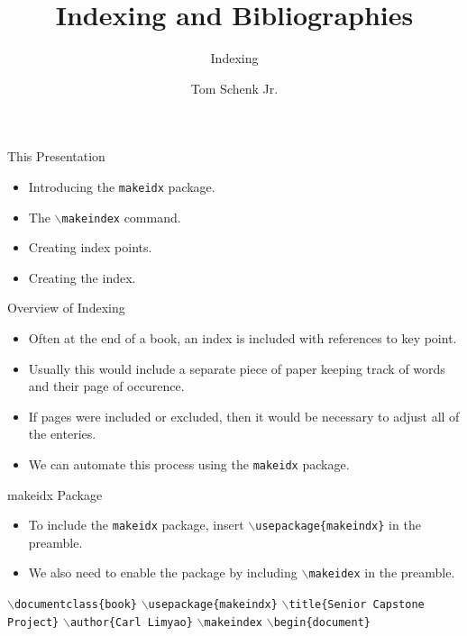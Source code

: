 \documentclass[pdf]{prosper}
\title{Indexing and Bibliographies}
\subtitle{Indexing}
\author{Tom Schenk Jr.}
\begin{document}
\maketitle
\begin{slide}{This Presentation}
	\begin{itemize}
		\item Introducing the \texttt{makeidx} package.
		\item The \texttt{$\backslash$makeindex} command.
		\item Creating index points.
		\item Creating the index.
	\end{itemize}
\end{slide}
\begin{slide}{Overview of Indexing}
	\begin{itemize}
		\item Often at the end of a book, an index is included with references to key point.
		\item Usually this would include a separate piece of paper keeping track of words and their page of occurence.
		\item If pages were included or excluded, then it would be necessary to adjust all of the enteries.
		\item We can automate this process using the \texttt{makeidx} package.
	\end{itemize}
\end{slide}
\begin{slide}{makeidx Package}
	\begin{itemize}
		\item To include the \texttt{makeidx} package, insert \texttt{$\backslash$usepackage\{makeindx\}} in the preamble.
		\item We also need to enable the package by including \texttt{$\backslash$makeidex} in the preamble.
	\end{itemize}
\texttt{$\backslash$documentclass\{book\}}
\texttt{$\backslash$usepackage\{makeindx\}}
\texttt{$\backslash$title\{Senior Capstone Project\}}
\texttt{$\backslash$author\{Carl Limyao\}}
\texttt{$\backslash$makeindex}
\texttt{$\backslash$begin\{document\}}
\end{slide}
\end{document}
